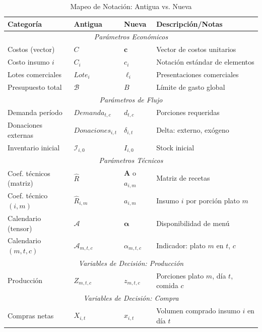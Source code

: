 
\begin{table}[h]
\centering
\caption{Mapeo de Notación: Antigua vs. Nueva}
\label{tab:notation-mapping}

\begin{tabular}{|l|l|l|p{6cm}|}
\hline
\textbf{Categoría} & \textbf{Antigua} & \textbf{Nueva} & \textbf{Descripción/Notas} \\
\hline
\multicolumn{4}{|c|}{\textit{Parámetros Económicos}} \\
\hline
Costos (vector) & $C$ & $\mathbf{c}$ & Vector de costos unitarios \\
Costo insumo $i$ & $C_i$ & $c_i$ & Notación estándar de elementos \\
Lotes comerciales & $Lote_i$ & $\ell_i$ & Presentaciones comerciales \\
Presupuesto total & $\mathcal{B}$ & $B$ & Límite de gasto global \\
\hline
\multicolumn{4}{|c|}{\textit{Parámetros de Flujo}} \\
\hline
Demanda período & $Demanda_{t,c}$ & $d_{t,c}$ & Porciones requeridas \\
Donaciones externas & $Donaciones_{i,t}$ & $\delta_{i,t}$ & Delta: externo, exógeno \\
Inventario inicial & $\mathcal{I}_{i,0}$ & $I_{i,0}$ & Stock inicial \\
\hline
\multicolumn{4}{|c|}{\textit{Parámetros Técnicos}} \\
\hline
Coef. técnicos (matriz) & $\hat{R}$ & $\mathbf{A}$ o $a_{i,m}$ & Matriz de recetas \\
Coef. técnico $(i,m)$ & $\hat{R}_{i,m}$ & $a_{i,m}$ & Insumo $i$ por porción plato $m$ \\
Calendario (tensor) & $\mathcal{A}$ & $\boldsymbol{\alpha}$ & Disponibilidad de menú \\
Calendario $(m,t,c)$ & $\mathcal{A}_{m,t,c}$ & $\alpha_{m,t,c}$ & Indicador: plato $m$ en $t$, $c$ \\
\hline
\multicolumn{4}{|c|}{\textit{Variables de Decisión: Producción}} \\
\hline
Producción & $Z_{m,t,c}$ & $z_{m,t,c}$ & Porciones plato $m$, día $t$, comida $c$ \\
\hline
\multicolumn{4}{|c|}{\textit{Variables de Decisión: Compra}} \\
\hline
Compras netas & $X_{i,t}$ & $x_{i,t}$ & Volumen comprado insumo $i$ en día $t$ \\

\end{tabular}
\end{table}
